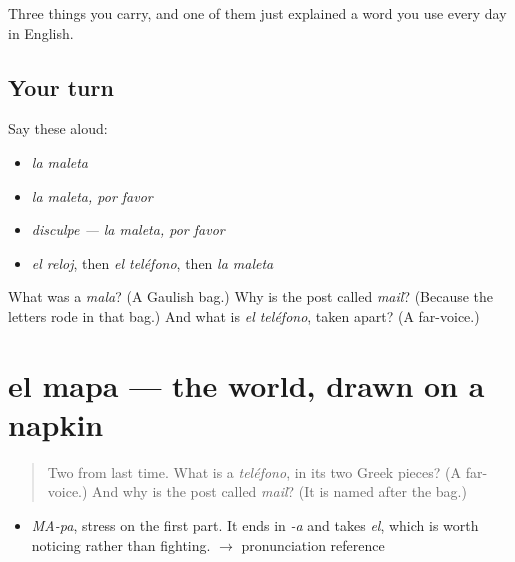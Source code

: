 \begin{grammarlens}[title={What you've built}]
Three things you carry, and one of them just explained a word you use every day in English.
\end{grammarlens}

\subsection*{Your turn}
Say these aloud:

\begin{itemize}
\raggedright
  \item \emph{la maleta}
  \item \emph{la maleta, por favor}
  \item \emph{disculpe — la maleta, por favor}
  \item \emph{el reloj}, then \emph{el teléfono}, then \emph{la maleta}
\end{itemize}

\begin{tcolorbox}[breakable,colback=teal!4,colframe=teal!35!black,title={Before you move on}]
What was a \emph{mala}? (A Gaulish bag.) Why is the post called \emph{mail}? (Because the letters rode in that bag.) And what is \emph{el teléfono}, taken apart? (A far-voice.)
\end{tcolorbox}
\section[el mapa]{el mapa — the world, drawn on a napkin}

\label{lesson:ES-C312-mapa}



\begin{quote}
Two from last time. What is a \emph{teléfono}, in its two Greek pieces? (A far-voice.) And why is the post called \emph{mail}? (It is named after the bag.)
\end{quote}

\begin{sounds}
\begin{itemize}
\raggedright
  \item \emph{MA-pa}, stress on the first part. It ends in \emph{-a} and takes \emph{el}, which is worth noticing rather than fighting. $\to$ pronunciation reference
\end{itemize}
\end{sounds}

